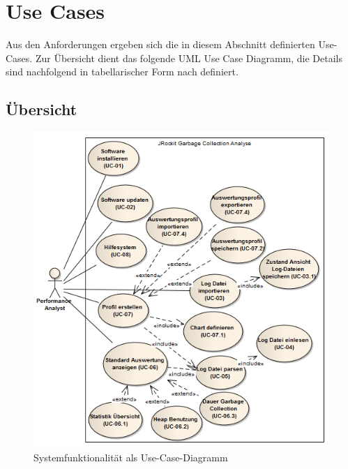 \section{Use Cases}\label{use_cases}
Aus den Anforderungen ergeben sich die in diesem Abschnitt definierten Use-Cases. Zur Übersicht dient das folgende UML Use Case Diagramm, die Details sind nachfolgend in tabellarischer Form nach \cite[S. 78-79]{pohl2010basiswissen} definiert.
\subsection{Übersicht}\label{systemfunktionalitaet}
 \begin{figure}[H]
  	\centering
    	\includegraphics[width=14cm]{images/anforderungen_use-case}
        	\caption{Systemfunktionalität als Use-Case-Diagramm}
\end{figure}
